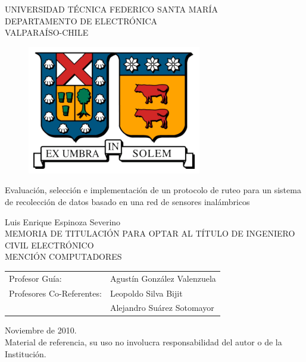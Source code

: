 \begin{titlepage}

\begin{center}

	\large  UNIVERSIDAD TÉCNICA FEDERICO SANTA MARÍA 	\\
 	\large \sc DEPARTAMENTO DE ELECTRÓNICA						\\
 	\large \sc VALPARAÍSO-CHILE												\\
\begin{figure}[h!]
	\centering
 	\includegraphics[scale=1]{imgs/logo_utfsm.eps} 
\end{figure}
\end{center}

\begin{center}
 \LARGE{Evaluación, selección e implementación de un protocolo de ruteo para un sistema de recolección de datos basado en una red de sensores inalámbricos}
\end{center}

\begin{center}
 \normalsize Luis Enrique Espinoza Severino			\\
 \normalsize MEMORIA DE TITULACIÓN PARA OPTAR AL TÍTULO DE
 \normalsize INGENIERO CIVIL ELECTRÓNICO			\\
 \normalsize MENCIÓN COMPUTADORES
\end{center}
\vspace*{1.5cm}

\begin{center}
\begin{tabular}{ll}
 \normalsize Profesor Guía: & Agustín González Valenzuela\\
 \normalsize Profesores Co-Referentes: & Leopoldo Silva Bijit\\
 															& Alejandro Suárez Sotomayor
\end{tabular}
\end{center}
 
\vspace*{2cm}
\begin{center}
 \normalsize Noviembre de 2010. \\
 \normalsize Material de referencia, su uso no involucra responsabilidad del autor o de la Institución.
\end{center}
\end{titlepage}